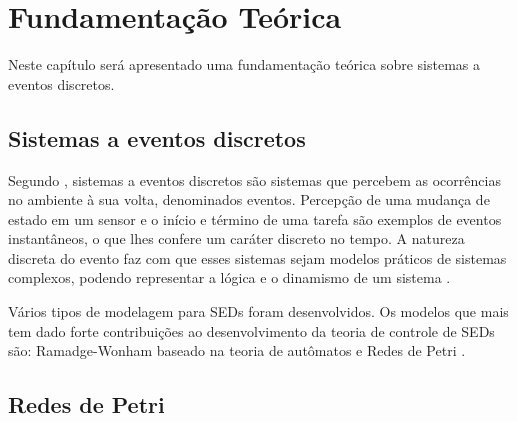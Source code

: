 
\chapter{Fundamenta\c{c}\~ao Te\'orica}

Neste cap\'itulo ser\'a apresentado uma fundamenta\c{c}\~ao te\'orica sobre sistemas a eventos discretos.

\section{Sistemas a eventos discretos}

Segundo \cite{apostilacury}, sistemas a eventos discretos s\~ao sistemas que percebem as ocorr\^encias no ambiente \`a sua volta, denominados eventos. Percep\c{c}\~ao de uma mudan\c{c}a de estado em um sensor e o in\'icio e t\'ermino de uma tarefa s\~ao exemplos de eventos instant\^aneos, o que lhes confere um car\'ater discreto no tempo. A natureza discreta do evento faz com que esses sistemas sejam modelos pr\'aticos de sistemas complexos, podendo representar a l\'ogica e o dinamismo de um sistema \cite{moody1998}.

V\'arios tipos de modelagem para SEDs foram desenvolvidos. Os modelos que mais tem dado forte contribui\c{c}\~oes ao desenvolvimento da teoria de controle de SEDs s\~ao: Ramadge-Wonham baseado na teoria de aut\^omatos e Redes de Petri \cite{apostilacury}.




\section{Redes de Petri}

